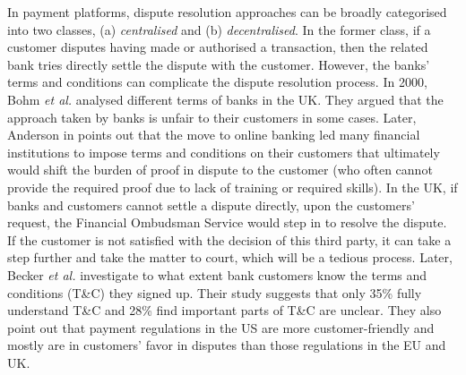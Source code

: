 In payment platforms,  dispute resolution approaches can be broadly categorised into two classes, (a) \emph{centralised} and (b) \emph{decentralised}. In the former class,  if a customer  disputes having made or authorised a transaction, then the related bank tries directly settle the dispute with the customer.  However, the banks' terms and conditions can complicate the dispute resolution process. In 2000, Bohm \textit{et al.} \cite{BohmBG00} analysed different terms of banks in the UK. They argued that the approach taken by banks is unfair to their customers in some cases. Later,  Anderson in \cite{anderson2007closing} points out that the move to online banking led many financial institutions to impose terms and conditions on their customers that ultimately would shift the burden of proof in dispute to the customer (who often cannot  provide the required proof due to lack of training or required skills). In the UK, if banks and customers cannot settle a dispute directly, upon the customers' request, the  Financial Ombudsman Service would step in to resolve the dispute. If the customer is  not satisfied with the decision of this third party, it can take a step further and take  the matter to court, which will be  a tedious process. Later,  Becker \textit{et al.} \cite{BeckerHAABMSS17} investigate to what extent bank customers know the terms and conditions (T\&C) they  signed up. Their study suggests that only 35\% fully understand T\&C and  28\% find important parts of T\&C are unclear. They also point out that  payment regulations in the US are more customer-friendly and mostly are in  customers' favor in disputes than those regulations in the EU and UK. 

